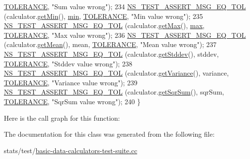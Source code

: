 \begin{DoxyCode}
      \hyperlink{basic-data-calculators-test-suite_8cc_a89311a98397f9d6967d2cb10d5152d77}{TOLERANCE}, \textcolor{stringliteral}{"Sum value wrong"});
234   \hyperlink{group__testing_ga9e7861b56b4e70db3b56044cb7a28e41}{NS\_TEST\_ASSERT\_MSG\_EQ\_TOL} (calculator.\hyperlink{classns3_1_1MinMaxAvgTotalCalculator_a6a506061da906ea3a1262a5f0394d68e}{getMin}(),      
      \hyperlink{80211b_8c_ac6afabdc09a49a433ee19d8a9486056d}{min},      \hyperlink{basic-data-calculators-test-suite_8cc_a89311a98397f9d6967d2cb10d5152d77}{TOLERANCE}, \textcolor{stringliteral}{"Min value wrong"});
235   \hyperlink{group__testing_ga9e7861b56b4e70db3b56044cb7a28e41}{NS\_TEST\_ASSERT\_MSG\_EQ\_TOL} (calculator.\hyperlink{classns3_1_1MinMaxAvgTotalCalculator_afb4430b9969e6acc05849bb9df444105}{getMax}(),      
      \hyperlink{80211b_8c_affe776513b24d84b39af8ab0930fef7f}{max},      \hyperlink{basic-data-calculators-test-suite_8cc_a89311a98397f9d6967d2cb10d5152d77}{TOLERANCE}, \textcolor{stringliteral}{"Max value wrong"});
236   \hyperlink{group__testing_ga9e7861b56b4e70db3b56044cb7a28e41}{NS\_TEST\_ASSERT\_MSG\_EQ\_TOL} (calculator.\hyperlink{classns3_1_1MinMaxAvgTotalCalculator_aba502282a75bae4c6f2f8f6fdc872cfe}{getMean}(),     mean,     
      \hyperlink{basic-data-calculators-test-suite_8cc_a89311a98397f9d6967d2cb10d5152d77}{TOLERANCE}, \textcolor{stringliteral}{"Mean value wrong"});
237   \hyperlink{group__testing_ga9e7861b56b4e70db3b56044cb7a28e41}{NS\_TEST\_ASSERT\_MSG\_EQ\_TOL} (calculator.\hyperlink{classns3_1_1MinMaxAvgTotalCalculator_a7dfbeb8a90ff11304b32df5f1b49482a}{getStddev}(),   stddev,   
      \hyperlink{basic-data-calculators-test-suite_8cc_a89311a98397f9d6967d2cb10d5152d77}{TOLERANCE}, \textcolor{stringliteral}{"Stddev value wrong"});
238   \hyperlink{group__testing_ga9e7861b56b4e70db3b56044cb7a28e41}{NS\_TEST\_ASSERT\_MSG\_EQ\_TOL} (calculator.\hyperlink{classns3_1_1MinMaxAvgTotalCalculator_a3dbf06a0a31cdab9dd780a6f263f6a55}{getVariance}(), variance, 
      \hyperlink{basic-data-calculators-test-suite_8cc_a89311a98397f9d6967d2cb10d5152d77}{TOLERANCE}, \textcolor{stringliteral}{"Variance value wrong"});
239   \hyperlink{group__testing_ga9e7861b56b4e70db3b56044cb7a28e41}{NS\_TEST\_ASSERT\_MSG\_EQ\_TOL} (calculator.\hyperlink{classns3_1_1MinMaxAvgTotalCalculator_a5f7ce191a74642f91590ede3c5c0315a}{getSqrSum}(),   sqrSum,   
      \hyperlink{basic-data-calculators-test-suite_8cc_a89311a98397f9d6967d2cb10d5152d77}{TOLERANCE}, \textcolor{stringliteral}{"SqrSum value wrong"});
240 \}
\end{DoxyCode}


Here is the call graph for this function\+:




The documentation for this class was generated from the following file\+:\begin{DoxyCompactItemize}
\item 
stats/test/\hyperlink{basic-data-calculators-test-suite_8cc}{basic-\/data-\/calculators-\/test-\/suite.\+cc}\end{DoxyCompactItemize}
